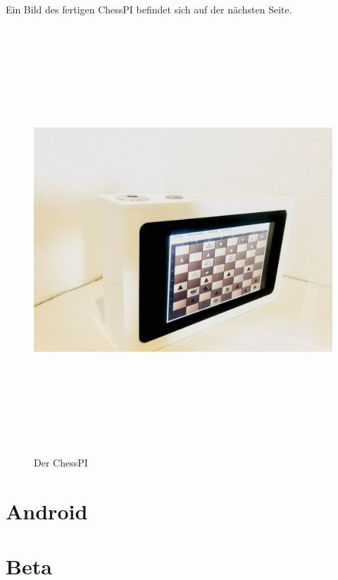 \documentclass[12pt,a4paper]{article}
\begin{document}
{Ein Bild des fertigen ChessPI befindet sich auf der nächsten Seite.

\newpage

\begin{figure}[H]
  \centering
		\includegraphics[height =  16cm, angle=90]{graphics/chesspi.jpg}
		\caption{Der ChessPI}
		\label{fig:case}
\end{figure}

\clearpage\vfill\newpage{}
\section{Android}
\label{SEC:android}

\clearpage\vfill\newpage{}
\section{Beta}
\label{SEC:beta}

}
\end{document}
